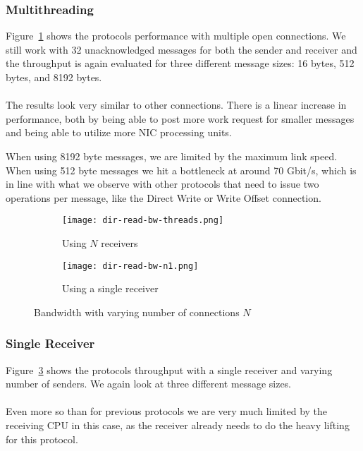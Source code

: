 \subsubsection{Multithreading}
Figure~\ref{fig:plot-dirread-bw-threads} shows the protocols performance with multiple open connections. We still work with 
32 unacknowledged messages for both the sender and receiver and the throughput is again evaluated for three different message 
sizes: 16 bytes, 512 bytes, and 8192 bytes. 

\paragraph{} The results look very similar to other connections. There is a linear increase in performance, both by being 
able to post more work request for smaller messages and being able to utilize more NIC processing units.~\cite{anuj-guide}

When using 8192 byte messages, we are limited by the maximum link speed. When using 512 byte messages we hit a bottleneck at
around 70 Gbit/s, which is in line with what we observe with other protocols that need to issue two operations per message, 
like the Direct Write or Write Offset connection.



\begin{figure}[ht]
  \begin{subfigure}[b]{0.49\textwidth}
  \centering
  \texttt{[image: dir-read-bw-threads.png]}
  \caption{Using $N$ receivers}
  \label{fig:plot-dirread-bw-threads}
  \end{subfigure}
  \begin{subfigure}[b]{0.49\textwidth}
  \centering
  \texttt{[image: dir-read-bw-n1.png]}
  \caption{Using a single receiver}
  \label{fig:plot-dirread-bw-n1}
  \end{subfigure}
  \caption{Bandwidth with varying number of connections $N$}
\end{figure}

\subsubsection{Single Receiver}

Figure~\ref{fig:plot-dirread-bw-n1} shows the protocols throughput with a single receiver and varying number of senders.
We again look at three different message sizes. 

\paragraph{} Even more so than for previous protocols we are very much limited by the receiving CPU in this case, as the 
receiver already needs to do the heavy lifting for this protocol. 

